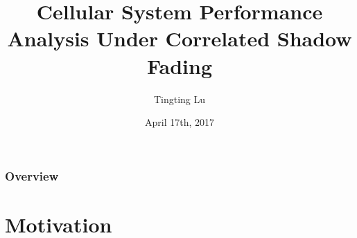 \documentclass{beamer}
\title[Thesis Defense]{Cellular System Performance Analysis Under Correlated Shadow Fading} %
\author{Tingting Lu} %
\institute[NYU] %
{
New York University \\ %
Tandon School of Engineering\\
\medskip
\textit{tl984@nyu.edu} %
}
\date{April 17th, 2017} %
\begin{document}
\begin{frame}
\titlepage %
\end{frame}

\begin{frame}
\frametitle{Overview} %
\tableofcontents %
\end{frame}


\section{Motivation} %
\end{document}
